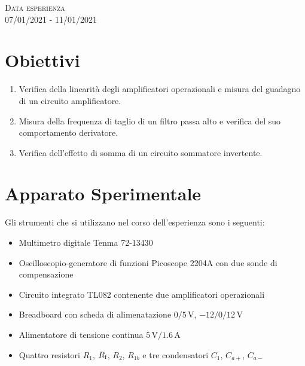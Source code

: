 \documentclass[a4paper,11pt]{article}
\begin{document}
\begin{titlepage}


	\vfill\vfill\vfill %

	{\large \textsc{Data esperienza}\\
  07/01/2021 - 11/01/2021}




	\vfill %

\end{titlepage}

\cleardoublepage

\section{Obiettivi}
\begin{enumerate}
	\item Verifica della linearità degli amplificatori operazionali e misura del guadagno di un circuito amplificatore.
	\item Misura della frequenza di taglio di un filtro passa alto e verifica del suo comportamento derivatore.
	\item Verifica dell'effetto di somma di un circuito sommatore invertente.
\end{enumerate}

\section{Apparato Sperimentale}
Gli strumenti che si utilizzano nel corso dell'esperienza sono i seguenti:
\begin{itemize}
	\item Multimetro digitale Tenma 72-13430
  	\item Oscilloscopio-generatore di funzioni Picoscope 2204A con due sonde di compensazione
	\item Circuito integrato TL082 contenente due amplificatori operazionali
	\item Breadboard con scheda di alimenatazione $0/5\,\si{\volt}$, $-12/0/12\, \si{\volt}$
	\item Alimentatore di tensione continua $5\,\si{\volt}/1.6\,\si\ampere$
	\item Quattro resistori $R_1$, $R_\text f$, $R_2$, $R_{1b}$ e tre condensatori $C_1$, $C_{a+}$, $C_{a-}$
\end{itemize}
\end{document}
